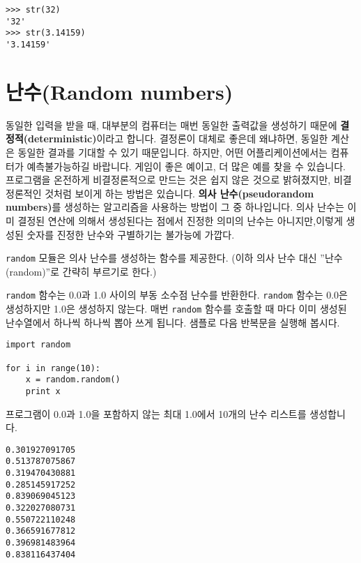 
\beforeverb
\begin{verbatim}
>>> str(32)
'32'
>>> str(3.14159)
'3.14159'
\end{verbatim}
\afterverb
%

\section{난수(Random numbers)}


동일한 입력을 받을 때, 대부분의 컴퓨터는 매번 동일한 출력값을 생성하기 때문에 {\bf 결정적(deterministic)}이라고 합니다.
결정론이 대체로 좋은데 왜냐하면, 동일한 계산은 동일한 결과를 기대할 수 있기 때문입니다. 하지만, 어떤 어플리케이션에서는 컴퓨터가 예측불가능하길 바랍니다. 게임이 좋은 예이고, 더 많은 예를 찾을 수 있습니다. 
프로그램을 온전하게 비결정론적으로 만드는 것은 쉽지 않은 것으로 밝혀졌지만, 비결정론적인 것처럼 보이게 하는 방법은 있습니다. {\bf 의사 난수(pseudorandom numbers)}를 생성하는 알고리즘을 사용하는 방법이 그 중 하나입니다. 의사 난수는 이미 결정된 연산에 의해서 생성된다는 점에서 
진정한 의미의 난수는 아니지만,이렇게 생성된 숫자를 진정한 난수와 구별하기는 불가능에 가깝다.


{\tt random} 모듈은 의사 난수를 생성하는 함수를 제공한다. (이하 의사 난수 대신 ''난수(random)''로 간략히 부르기로 한다.)


{\tt random} 함수는 0.0과 1.0 사이의 부동 소수점 난수를 반환한다. {\tt random} 함수는 0.0은 생성하지만 1.0은 생성하지 않는다.
매번 {\tt random} 함수를 호출할 때 마다 이미 생성된 난수열에서 하나씩 하나씩 뽑아 쓰게 됩니다. 샘플로 다음 반복문을 실행해 봅시다.

\beforeverb
\begin{verbatim}
import random

for i in range(10):
    x = random.random()
    print x
\end{verbatim}
\afterverb
%

프로그램이 0.0과 1.0을 포함하지 않는 최대 1.0에서 10개의 난수 리스트를 생성합니다.

\beforeverb
\begin{verbatim}
0.301927091705
0.513787075867
0.319470430881
0.285145917252
0.839069045123
0.322027080731
0.550722110248
0.366591677812
0.396981483964
0.838116437404
\end{verbatim}
\afterverb
%

